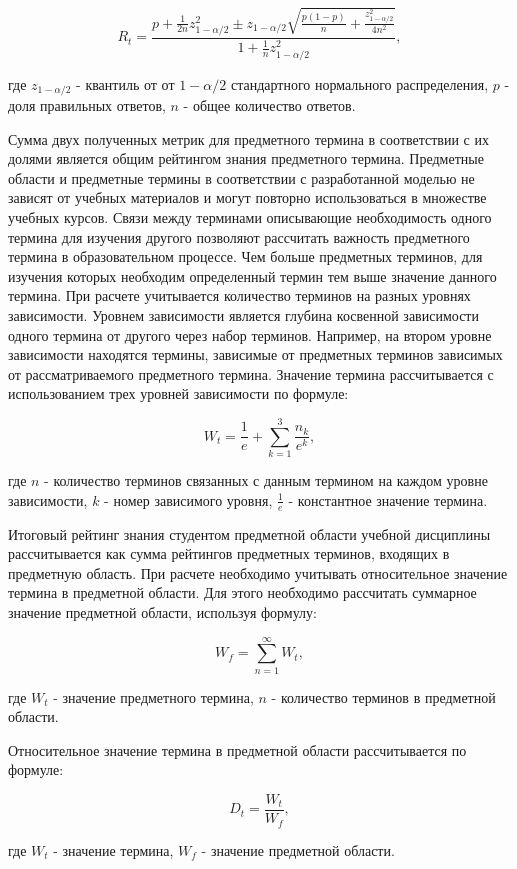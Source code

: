 $$
    R_t = \frac{p+\frac{1}{2n}z_{1-\alpha/2}^2 \pm z_{1-\alpha/2}\sqrt{\frac{p(1-p)}{n}+\frac{z_{1-\alpha/2}^2}{4n^2}}{} }{1+\frac{1}{n}z_{1-\alpha/2}^2},
$$

где \(z_{1-\alpha/2}\) - квантиль от от \(1-\alpha/2\) стандартного нормального распределения, \(p\) - доля правильных ответов, \(n\) - общее количество ответов. 

Сумма двух полученных метрик для предметного термина в соответствии с их долями является общим рейтингом знания предметного термина. Предметные области и предметные термины в соответствии с разработанной моделью не зависят от учебных материалов и могут повторно использоваться в множестве учебных курсов. Связи между терминами описывающие необходимость одного термина для изучения другого позволяют рассчитать важность предметного термина в образовательном процессе. Чем больше предметных терминов, для изучения которых необходим определенный термин тем выше значение данного термина. При расчете учитывается количество терминов на разных уровнях зависимости. Уровнем зависимости является глубина косвенной зависимости одного термина от другого через набор терминов. Например, на втором уровне зависимости находятся термины, зависимые от предметных терминов зависимых от рассматриваемого предметного термина. Значение термина рассчитывается с использованием трех уровней зависимости по формуле: 

$$
    W_t = \frac{1}{e}+\sum_{k=1}^{3}\frac{n_k}{e^k}, 
$$

где \(n\) - количество терминов связанных с данным термином на каждом уровне зависимости, \(k\) - номер зависимого уровня, \( \frac{1}{e} \) - константное значение термина. 

Итоговый рейтинг знания студентом предметной области учебной дисциплины рассчитывается как сумма рейтингов предметных терминов, входящих в предметную область. При расчете необходимо учитывать относительное значение термина в предметной области. Для этого необходимо рассчитать суммарное значение предметной области, используя формулу:

$$  
    W_f = \sum_{n=1}^{\infty}W_t,
$$

где \(W_t\) - значение предметного термина, \(n\) - количество терминов в предметной области.

Относительное значение термина в предметной области рассчитывается по формуле:

$$
    D_t = \frac{W_t}{W_f},
$$

где \(W_t\) - значение термина, \(W_f\) - значение предметной области.

